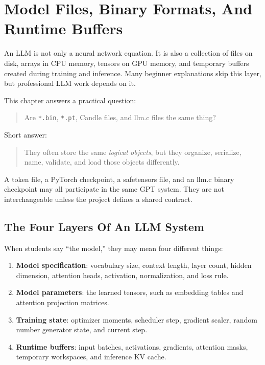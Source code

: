 \chapter{Model Files, Binary Formats, And Runtime Buffers}

An LLM is not only a neural network equation. It is also a collection of files on disk,
arrays in CPU memory, tensors on GPU memory, and temporary buffers created during training
and inference. Many beginner explanations skip this layer, but professional LLM work
depends on it.

This chapter answers a practical question:

\begin{quote}
Are \texttt{*.bin}, \texttt{*.pt}, Candle files, and llm.c files the same thing?
\end{quote}

Short answer:

\begin{quote}
They often store the same \emph{logical objects}, but they organize, serialize, name,
validate, and load those objects differently.
\end{quote}

A token file, a PyTorch checkpoint, a safetensors file, and an llm.c binary checkpoint
may all participate in the same GPT system. They are not interchangeable unless the
project defines a shared contract.

\section{The Four Layers Of An LLM System}

When students say ``the model,'' they may mean four different things:

\begin{enumerate}
  \item \textbf{Model specification}: vocabulary size, context length, layer count,
  hidden dimension, attention heads, activation, normalization, and loss rule.
  \item \textbf{Model parameters}: the learned tensors, such as embedding tables and
  attention projection matrices.
  \item \textbf{Training state}: optimizer moments, scheduler step, gradient scaler,
  random number generator state, and current step.
  \item \textbf{Runtime buffers}: input batches, activations, gradients, attention masks,
  temporary workspaces, and inference KV cache.
\end{enumerate}

